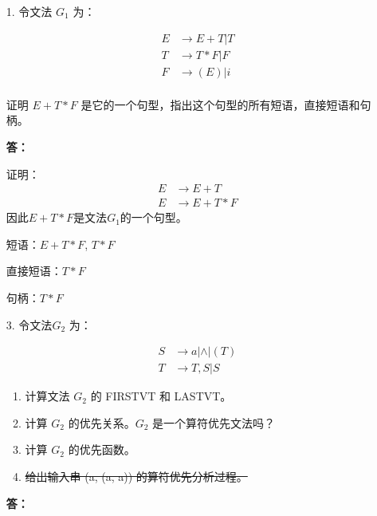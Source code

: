 
\begin{enumerate}
    \item[1.] 令文法 $G_1$ 为：
    
    \begin{align*}
        E & \to E + T | T \\
        T & \to T * F | F \\
        F & \to (E) | i \\
    \end{align*}
    
    证明 $ E + T * F $ 是它的一个句型，指出这个句型的所有短语，直接短语和句柄。

    \textbf{答：}
    
    证明： 
    \begin{align*}
        E & \to E + T \\
        E & \to E + T * F
    \end{align*}
    因此$ E + T * F $是文法$G_1$的一个句型。
    
    短语：$E + T * F$, $T * F$
    
    直接短语：$T * F$
    
    句柄：$T * F$
    
            
    
    \item[3.] 令文法\footnotemark $G_2$ 为：
    
    
    \begin{align*}
        S & \to a | \wedge | (T) \\
        T & \to T, S | S 
    \end{align*}
    
    \begin{enumerate}
        \item 计算文法 $G_2$ 的 FIRSTVT 和 LASTVT。
        \item 计算 $G_2$ 的优先关系。$G_2$ 是一个算符优先文法吗？
        \item 计算 $G_2$ 的优先函数。
        \item \sout{给出输入串 (a, (a, a)) 的算符优先分析过程。}
    \end{enumerate}
    
    \textbf{答：}
    \begin{enumerate}
        

\end{enumerate}
\end{enumerate}

